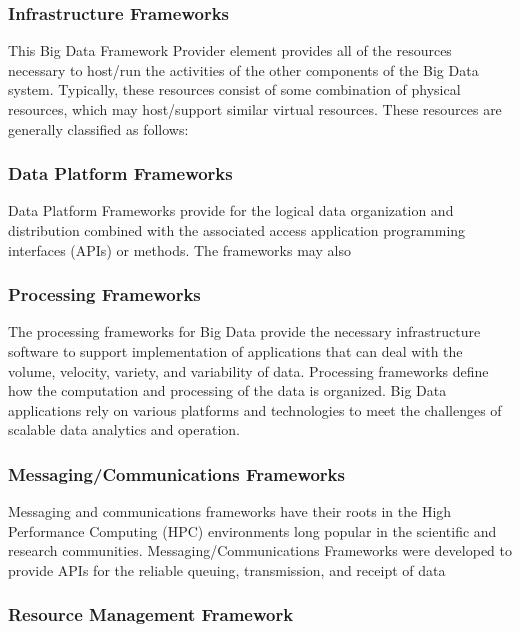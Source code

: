\documentclass[11pt]{article}
\begin{document}
\subsubsection{Infrastructure Frameworks}

This Big Data Framework Provider element provides all of the resources necessary to host/run the 
activities of the other components of the Big Data system. Typically, these resources consist of some 
combination of physical resources, which may host/support similar virtual resources. These resources are 
generally classified as follows:

\subsubsection{Data Platform Frameworks}

Data Platform Frameworks provide for the logical data organization and distribution combined with the 
associated access application programming interfaces (APIs) or methods. The frameworks may also 

\subsubsection{Processing Frameworks}

The processing frameworks for Big Data provide the necessary infrastructure software to support 
implementation of applications that can deal with the volume, velocity, variety, and variability of data. 
Processing frameworks define how the computation and processing of the data is organized. Big Data 
applications rely on various platforms and technologies to meet the challenges of scalable data analytics 
and operation. 

\subsubsection{Messaging/Communications Frameworks}

Messaging and communications frameworks have their roots in the High Performance Computing (HPC) 
environments long popular in the scientific and research communities. Messaging/Communications 
Frameworks were developed to provide APIs for the reliable queuing, transmission, and receipt of data 

\subsubsection{Resource Management Framework}
\end{document}
